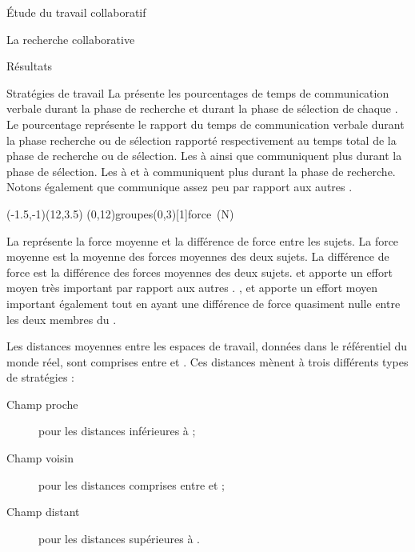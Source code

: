\documentclass[myfrancais]{mythesis}
\begin{document}
\begin{mypart}{Étude du travail collaboratif}
\begin{mychapter}{La recherche collaborative}
\begin{mysection}{Résultats}
\begin{mysubsection}{Stratégies de travail}
					La  présente les pourcentages de temps de communication verbale durant la phase de recherche et durant la phase de sélection de chaque .
					Le pourcentage représente le rapport du temps de communication verbale durant la phase recherche ou de sélection rapporté respectivement au temps total de la phase de recherche ou de sélection.
					Les   à  ainsi que  communiquent plus durant la phase de sélection.
					Les   à  et  à  communiquent plus durant la phase de recherche.
					Notons également que  communique assez peu par rapport aux autres .

					\begin{myfigure}
						\begin{myps}(-1.5,-1)(12,3.5)
							\myaxes(0,12){groupes}(0,3)[1]{force~(N)}
						\end{myps}
					\end{myfigure}

					La  représente la force moyenne et la différence de force entre les sujets.
					La force moyenne est la moyenne des forces moyennes des deux sujets.
					La différence de force est la différence des forces moyennes des deux sujets.
					 et  apporte un effort moyen très important par rapport aux autres .
					,  et  apporte un effort moyen important également tout en ayant une différence de force quasiment nulle entre les deux membres du .

					Les distances moyennes entre les espaces de travail, données dans le référentiel du monde réel, sont comprises entre  et .
					Ces distances mènent à trois différents types de stratégies :
					\begin{description}
						\item[Champ proche] pour les distances inférieures à ;
						\item[Champ voisin] pour les distances comprises entre  et ;
						\item[Champ distant] pour les distances supérieures à .
					\end{description}


\end{mysubsection}
\end{mysection}
\end{mychapter}
\end{mypart}
\end{document}
